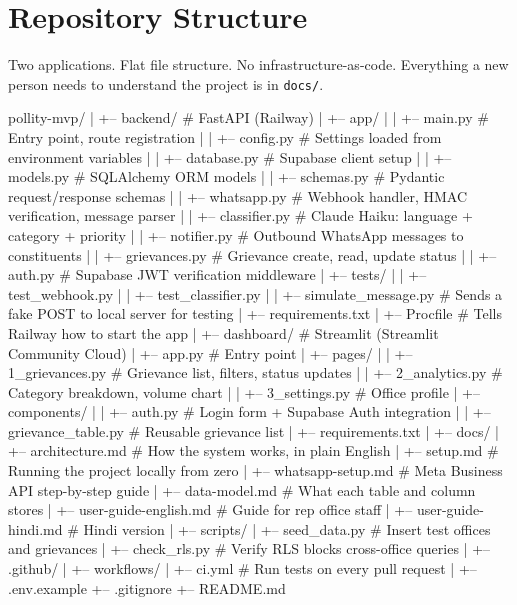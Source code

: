 \documentclass[12pt, a4paper]{article}
\begin{document}
\newpage

\section{Repository Structure}

Two applications. Flat file structure. No infrastructure-as-code.
Everything a new person needs to understand the project is in \texttt{docs/}.

\begin{treebox}
pollity-mvp/
|
+-- backend/                        # FastAPI (Railway)
|   +-- app/
|   |   +-- main.py                 # Entry point, route registration
|   |   +-- config.py               # Settings loaded from environment variables
|   |   +-- database.py             # Supabase client setup
|   |   +-- models.py               # SQLAlchemy ORM models
|   |   +-- schemas.py              # Pydantic request/response schemas
|   |   +-- whatsapp.py             # Webhook handler, HMAC verification, message parser
|   |   +-- classifier.py           # Claude Haiku: language + category + priority
|   |   +-- notifier.py             # Outbound WhatsApp messages to constituents
|   |   +-- grievances.py           # Grievance create, read, update status
|   |   +-- auth.py                 # Supabase JWT verification middleware
|   +-- tests/
|   |   +-- test_webhook.py
|   |   +-- test_classifier.py
|   |   +-- simulate_message.py     # Sends a fake POST to local server for testing
|   +-- requirements.txt
|   +-- Procfile                    # Tells Railway how to start the app
|
+-- dashboard/                      # Streamlit (Streamlit Community Cloud)
|   +-- app.py                      # Entry point
|   +-- pages/
|   |   +-- 1_grievances.py         # Grievance list, filters, status updates
|   |   +-- 2_analytics.py          # Category breakdown, volume chart
|   |   +-- 3_settings.py           # Office profile
|   +-- components/
|   |   +-- auth.py                 # Login form + Supabase Auth integration
|   |   +-- grievance_table.py      # Reusable grievance list
|   +-- requirements.txt
|
+-- docs/
|   +-- architecture.md             # How the system works, in plain English
|   +-- setup.md                    # Running the project locally from zero
|   +-- whatsapp-setup.md           # Meta Business API step-by-step guide
|   +-- data-model.md               # What each table and column stores
|   +-- user-guide-english.md       # Guide for rep office staff
|   +-- user-guide-hindi.md         # Hindi version
|
+-- scripts/
|   +-- seed_data.py                # Insert test offices and grievances
|   +-- check_rls.py                # Verify RLS blocks cross-office queries
|
+-- .github/
|   +-- workflows/
|       +-- ci.yml                  # Run tests on every pull request
|
+-- .env.example
+-- .gitignore
+-- README.md
\end{treebox}
\end{document}
